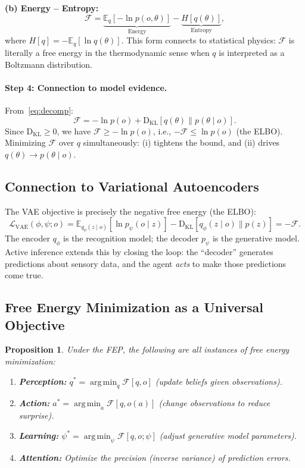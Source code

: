 \documentclass[11pt,a4paper]{article}
\newtheorem{proposition}[theorem]{Proposition}
\theoremstyle{definition}
\newcommand{\KL}{\mathrm{D}_{\mathrm{KL}}}
\newcommand{\E}{\mathbb{E}}
\newcommand{\cF}{\mathcal{F}}
\newcommand{\cL}{\mathcal{L}}
\DeclareMathOperator*{\argmin}{arg\,min}
\begin{document}
\medskip
\noindent
\textbf{(b) Energy -- Entropy:}
\begin{equation}
  \cF = \underbrace{\E_q[-\ln p(o, \theta)]}_{\text{Energy}}
      - \underbrace{H[q(\theta)]}_{\text{Entropy}},
  \label{eq:ee}
\end{equation}
where $H[q] = -\E_q[\ln q(\theta)]$.  This form connects to statistical
physics: $\cF$ is literally a free energy in the thermodynamic sense when $q$
is interpreted as a Boltzmann distribution.

\paragraph{Step 4: Connection to model evidence.}
From~\eqref{eq:decomp}:
\begin{equation}
  \cF = -\ln p(o) + \KL[q(\theta) \| p(\theta \mid o)].
  \label{eq:bound}
\end{equation}
Since $\KL \geq 0$, we have $\cF \geq -\ln p(o)$, i.e., $-\cF \leq \ln p(o)$
(the ELBO).  Minimizing $\cF$ over $q$ simultaneously: (i) tightens the bound,
and (ii) drives $q(\theta) \to p(\theta \mid o)$.

\subsection{Connection to Variational Autoencoders}

The VAE objective is precisely the negative free energy (the ELBO):
\begin{equation}
  \cL_{\text{VAE}}(\phi, \psi; o)
  = \E_{q_\phi(z \mid o)}[\ln p_\psi(o \mid z)]
  - \KL[q_\phi(z \mid o) \| p(z)]
  = -\cF.
\end{equation}
The encoder $q_\phi$ is the recognition model; the decoder $p_\psi$ is the
generative model.  Active inference extends this by closing the loop: the
``decoder'' generates predictions about sensory data, and the agent \emph{acts}
to make those predictions come true.

\subsection{Free Energy Minimization as a Universal Objective}

\begin{proposition}
Under the FEP, the following are all instances of free energy minimization:
\begin{enumerate}[leftmargin=2em]
  \item \textbf{Perception:} $q^* = \argmin_q \cF[q, o]$ (update beliefs given
    observations).
  \item \textbf{Action:} $a^* = \argmin_a \cF[q, o(a)]$ (change observations
    to reduce surprise).
  \item \textbf{Learning:} $\psi^* = \argmin_\psi \cF[q, o; \psi]$ (adjust
    generative model parameters).
  \item \textbf{Attention:} Optimize the precision (inverse variance) of
    prediction errors.
\end{enumerate}
\end{proposition}
\end{document}
